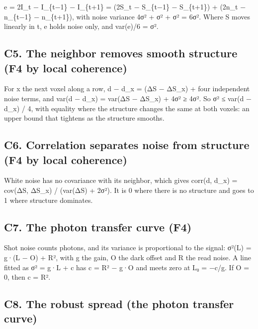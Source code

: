 e = 2I\_\allowbreak{}t − I\_\allowbreak{}\{t−1\} − I\_\allowbreak{}\{t+1\} = (2S\_\allowbreak{}t − S\_\allowbreak{}\{t−1\} − S\_\allowbreak{}\{t+1\}) + (2n\_\allowbreak{}t − n\_\allowbreak{}\{t−1\} − n\_\allowbreak{}\{t+1\}), with noise variance 4σ² + σ² + σ² = 6σ². Where S moves linearly in t, e holds noise only, and var(e)/6 = σ².

\subsection{\texorpdfstring{C5. The neighbor removes smooth structure (F4 by local coherence)}{C5. The neighbor removes smooth structure (F4 by local coherence)}}

For x the next voxel along a row, d − d\_\allowbreak{}x = (ΔS − ΔS\_\allowbreak{}x) + four independent noise terms, and var(d − d\_\allowbreak{}x) = var(ΔS − ΔS\_\allowbreak{}x) + 4σ² ≥ 4σ². So σ² ≤ var(d − d\_\allowbreak{}x) / 4, with equality where the structure changes the same at both voxels: an upper bound that tightens as the structure smooths.

\subsection{\texorpdfstring{C6. Correlation separates noise from structure (F4 by local coherence)}{C6. Correlation separates noise from structure (F4 by local coherence)}}

White noise has no covariance with its neighbor, which gives corr(d, d\_\allowbreak{}x) = cov(ΔS, ΔS\_\allowbreak{}x) / (var(ΔS) + 2σ²). It is 0 where there is no structure and goes to 1 where structure dominates.

\subsection{\texorpdfstring{C7. The photon transfer curve (F4)}{C7. The photon transfer curve (F4)}}

Shot noise counts photons, and its variance is proportional to the signal: σ²(L) = g·(L − O) + R², with g the gain, O the dark offset and R the read noise. A line fitted as σ² = g·L + c has c = R² − g·O and meets zero at L₀ = −c/g. If O = 0, then c = R².

\subsection{\texorpdfstring{C8. The robust spread (the photon transfer curve)}{C8. The robust spread (the photon transfer curve)}}

